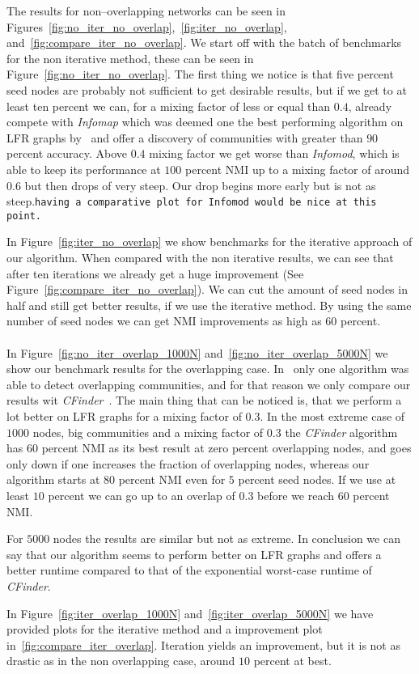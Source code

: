 The results for non--overlapping networks can be seen in Figures~\ref{fig:no_iter_no_overlap},~\ref{fig:iter_no_overlap}, and~\ref{fig:compare_iter_no_overlap}. We start off with the batch of benchmarks for the non iterative method, these can be seen in Figure~\ref{fig:no_iter_no_overlap}. The first thing we notice is that five percent seed nodes are probably not sufficient to get desirable results, but if we get to at least ten percent we can, for a mixing factor of less or equal than $0.4$, already compete with \textit{Infomap} which was deemed one the best performing algorithm on LFR graphs by~\cite{LF09} and offer a discovery of communities with greater than $90$ percent accuracy. Above $0.4$ mixing factor we get worse than \textit{Infomod}, which is able to keep its performance at $100$ percent NMI up to a mixing factor of around $0.6$ but then drops of very steep. Our drop begins more early but is not as steep.\texttt{having a comparative plot for Infomod would be nice at this point.}

In Figure~\ref{fig:iter_no_overlap} we show benchmarks for the iterative approach of our algorithm. When compared with the non iterative results, we can see that after ten iterations we already get a huge improvement (See Figure~\ref{fig:compare_iter_no_overlap}). We can cut the amount of seed nodes in half and still get better results, if we use the iterative method. By using the same number of seed nodes we can get NMI improvements as high as $60$ percent.\\ \\
In Figure~\ref{fig:no_iter_overlap_1000N} and~\ref{fig:no_iter_overlap_5000N} we show our benchmark results for the overlapping case. In~\cite{LF09} only one algorithm was able to detect overlapping communities, and for that reason we only compare our results wit \textit{CFinder}~\cite{PDFV05}. The main thing that can be noticed is, that we perform a lot better on LFR graphs for a mixing factor of $0.3$. In the most extreme case of $1000$ nodes, big communities and a mixing factor of $0.3$ the \textit{CFinder} algorithm has $60$ percent NMI as its best result at zero percent overlapping nodes, and goes only down if one increases the fraction of overlapping nodes, whereas our algorithm starts at $80$ percent NMI even for $5$ percent seed nodes. If we use at least $10$ percent we can go up to an overlap of $0.3$ before we reach $60$ percent NMI.

For $5000$ nodes the results are similar but not as extreme. In conclusion we can say that our algorithm seems to perform better on LFR graphs and offers a better runtime compared to that of the exponential worst-case runtime of \textit{CFinder}.

In Figure~\ref{fig:iter_overlap_1000N} and~\ref{fig:iter_overlap_5000N} we have provided plots for the iterative method and a improvement plot in~\ref{fig:compare_iter_overlap}. Iteration yields an improvement, but it is not as drastic as in the non overlapping case, around $10$ percent at best.
